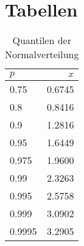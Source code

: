 %
%
%
\chapter{Tabellen\label{anhang-tabellen}}

\begin{table}[h]
\begin{center}
\begin{tabular}{|l|r|}
\hline
$p$&$x$\\
\hline
0.75&0.6745\\
0.8&0.8416\\
0.9&1.2816\\
0.95&1.6449\\
0.975&1.9600\\
0.99&2.3263\\
0.995&2.5758\\
0.999&3.0902\\
0.9995&3.2905\\
\hline
\end{tabular}
\end{center}
\caption{Quantilen der Normalverteilung\label{tabelle-normalquantilen}
}
\end{table}


